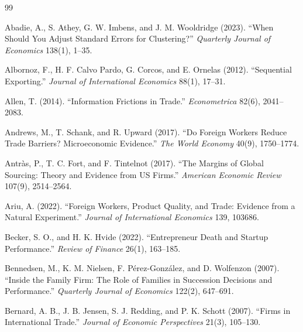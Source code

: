 \documentclass[12pt]{article}
\theoremstyle{remark}
\begin{document}
\begin{thebibliography}{99}
\setlength{\itemsep}{0.15em}
\small

Abadie, A., S. Athey, G. W. Imbens, and J. M. Wooldridge (2023). ``When Should You Adjust Standard Errors for Clustering?'' \textit{Quarterly Journal of Economics} 138(1), 1--35.

Albornoz, F., H. F. Calvo Pardo, G. Corcos, and E. Ornelas (2012). ``Sequential Exporting.'' \textit{Journal of International Economics} 88(1), 17--31.

Allen, T. (2014). ``Information Frictions in Trade.'' \textit{Econometrica} 82(6), 2041--2083.

Andrews, M., T. Schank, and R. Upward (2017). ``Do Foreign Workers Reduce Trade Barriers? Microeconomic Evidence.'' \textit{The World Economy} 40(9), 1750--1774.

Antr\`as, P., T. C. Fort, and F. Tintelnot (2017). ``The Margins of Global Sourcing: Theory and Evidence from US Firms.'' \textit{American Economic Review} 107(9), 2514--2564.

Ariu, A. (2022). ``Foreign Workers, Product Quality, and Trade: Evidence from a Natural Experiment.'' \textit{Journal of International Economics} 139, 103686.

Becker, S. O., and H. K. Hvide (2022). ``Entrepreneur Death and Startup Performance.'' \textit{Review of Finance} 26(1), 163--185.

Bennedsen, M., K. M. Nielsen, F. P\'erez-Gonz\'alez, and D. Wolfenzon (2007). ``Inside the Family Firm: The Role of Families in Succession Decisions and Performance.'' \textit{Quarterly Journal of Economics} 122(2), 647--691.

Bernard, A. B., J. B. Jensen, S. J. Redding, and P. K. Schott (2007). ``Firms in International Trade.'' \textit{Journal of Economic Perspectives} 21(3), 105--130.


\end{thebibliography}
\end{document}
